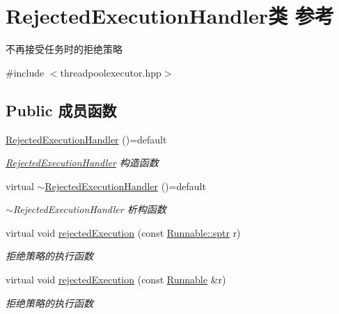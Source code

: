 \hypertarget{classRejectedExecutionHandler}{}\section{Rejected\+Execution\+Handler类 参考}
\label{classRejectedExecutionHandler}


不再接受任务时的拒绝策略  




{\ttfamily \#include $<$threadpoolexecutor.\+hpp$>$}

\subsection*{Public 成员函数}
\begin{DoxyCompactItemize}
\item 
\mbox{\label{classRejectedExecutionHandler_ac288960546b34a9f0e7be49c32d2f929}} 
\hyperlink{classRejectedExecutionHandler_ac288960546b34a9f0e7be49c32d2f929}{Rejected\+Execution\+Handler} ()=default
\begin{DoxyCompactList}\small\item\em \hyperlink{classRejectedExecutionHandler}{Rejected\+Execution\+Handler} 构造函数 \end{DoxyCompactList}\item 
\mbox{\label{classRejectedExecutionHandler_a640bb013143221dd4729b270da83ec5e}} 
virtual \hyperlink{classRejectedExecutionHandler_a640bb013143221dd4729b270da83ec5e}{$\sim$\+Rejected\+Execution\+Handler} ()=default
\begin{DoxyCompactList}\small\item\em $\sim$\+Rejected\+Execution\+Handler 析构函数 \end{DoxyCompactList}\item 
\mbox{\label{classRejectedExecutionHandler_a18d3240b63ffa8a84fa728f89c2ef1d1}} 
virtual void \hyperlink{classRejectedExecutionHandler_a18d3240b63ffa8a84fa728f89c2ef1d1}{rejected\+Execution} (const \hyperlink{classRunnable_abe8d3066c7305401d6f0aad8e70780f2}{Runnable\+::sptr} r)
\begin{DoxyCompactList}\small\item\em 拒绝策略的执行函数 \end{DoxyCompactList}\item 
\mbox{\label{classRejectedExecutionHandler_abb6476c7d64a7bd3111fc1a39829858b}} 
virtual void \hyperlink{classRejectedExecutionHandler_abb6476c7d64a7bd3111fc1a39829858b}{rejected\+Execution} (const \hyperlink{classRunnable}{Runnable} \&r)
\begin{DoxyCompactList}\small\item\em 拒绝策略的执行函数 \end{DoxyCompactList}\end{DoxyCompactItemize}


